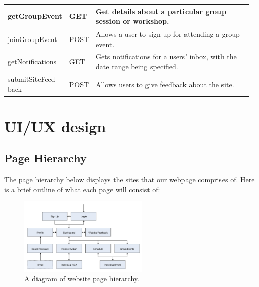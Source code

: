 \documentclass[10pt]{article}
\begin{document}
\begin{longtable}{|p{0.128\linewidth}|p{0.08\linewidth}|p{0.75\linewidth}|}
    getGroupEvent
    &
    GET
    &
    Get details about a particular group session or workshop.
    \\ \hline

    joinGroupEvent
    &
    POST
    &
    Allows a user to sign up for attending a group event.
    \\ \hline

    getNotifications
    &
    GET
    &
    Gets notifications for a users' inbox, with the date range being specified.
    \\ \hline

    submitSiteFeed- back
    &
    POST
    &
    Allows users to give feedback about the site.
    \\ \hline



\end{longtable}




\section{UI/UX design}

\subsection{Page Hierarchy}
The page hierarchy below displays the sites that our webpage comprises of. Here
is a brief outline of what each page will consist of:

\begin{figure}[H]
    \centering
    \includegraphics[width=0.55\textwidth]{Hierarchy}
    \caption{A diagram of website page hierarchy.}
    \label{fig:website_page_hierarchy}
\end{figure}
\end{document}
